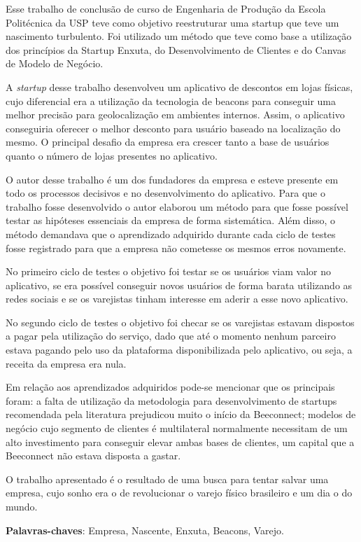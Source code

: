 \setlength{\absparsep}{18pt} %
\begin{resumo}
Esse trabalho de conclusão de curso de Engenharia de Produção da Escola Politécnica da USP teve como objetivo reestruturar uma startup que teve um nascimento turbulento. Foi utilizado um método que teve como base a utilização dos princípios da Startup Enxuta, do Desenvolvimento de Clientes e do Canvas de Modelo de Negócio.

A \textit{startup} desse trabalho desenvolveu um aplicativo de descontos em lojas físicas, cujo diferencial era a utilização da tecnologia de beacons para conseguir uma melhor precisão para geolocalização em ambientes internos. Assim, o aplicativo conseguiria oferecer o melhor desconto para usuário baseado na localização do mesmo. O principal desafio da empresa era crescer tanto a base de usuários quanto o número de lojas presentes no aplicativo.

O autor desse trabalho é um dos fundadores da empresa e esteve presente em todo os processos decisivos e no desenvolvimento do aplicativo. Para que o trabalho fosse desenvolvido o autor elaborou um método para que fosse possível testar as hipóteses essenciais da empresa de forma sistemática. Além disso, o método demandava que o aprendizado adquirido durante cada ciclo de testes fosse registrado para que a empresa não cometesse os mesmos erros novamente.

No primeiro ciclo de testes o objetivo foi testar se os usuários viam valor no aplicativo, se era possível conseguir novos usuários de forma barata utilizando as redes sociais e se os varejistas tinham interesse em aderir a esse novo aplicativo.

No segundo ciclo de testes o objetivo foi checar se os varejistas estavam dispostos a pagar pela utilização do serviço, dado que até o momento nenhum parceiro estava pagando pelo uso da plataforma disponibilizada pelo aplicativo, ou seja, a receita da empresa era nula.

Em relação aos aprendizados adquiridos pode-se mencionar que os principais foram: a falta de utilização da metodologia para desenvolvimento de startups recomendada pela literatura prejudicou muito o início da Beeconnect; modelos de negócio cujo segmento de clientes é multilateral normalmente necessitam de um alto investimento para conseguir elevar ambas bases de clientes, um capital que a Beeconnect não estava disposta a gastar.

O trabalho apresentado é o resultado de uma busca para tentar salvar uma empresa, cujo sonho era o de revolucionar o varejo físico brasileiro e um dia o do mundo.

\textbf{Palavras-chaves}: Empresa, Nascente, Enxuta, Beacons, Varejo.
\end{resumo}